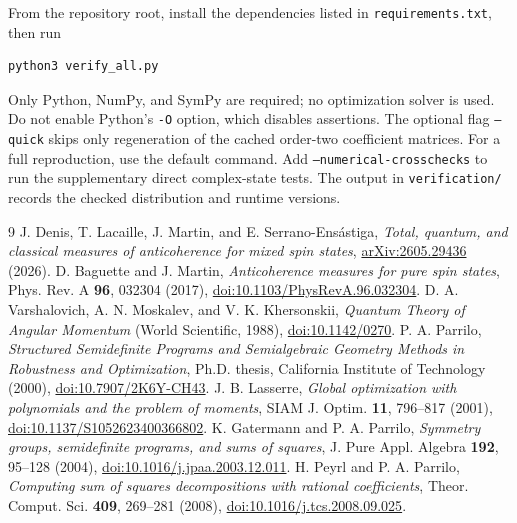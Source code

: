 \documentclass[11pt]{article}
\begin{document}
From the repository root, install the dependencies listed in \texttt{requirements.txt}, then run
\begin{verbatim}
python3 verify_all.py
\end{verbatim}
Only Python, NumPy, and SymPy are required; no optimization solver is used. Do not enable Python's \texttt{-O} option, which disables assertions. The optional flag \texttt{--quick} skips only regeneration of the cached order-two coefficient matrices. For a full reproduction, use the default command. Add \texttt{--numerical-crosschecks} to run the supplementary direct complex-state tests. The output in \texttt{verification/} records the checked distribution and runtime versions.

\begin{thebibliography}{9}
 J. Denis, T. Lacaille, J. Martin, and E. Serrano-Ens\'astiga, \emph{Total, quantum, and classical measures of anticoherence for mixed spin states}, \href{https://arxiv.org/abs/2605.29436}{arXiv:2605.29436} (2026).
 D. Baguette and J. Martin, \emph{Anticoherence measures for pure spin states}, Phys. Rev. A \textbf{96}, 032304 (2017), \href{https://doi.org/10.1103/PhysRevA.96.032304}{doi:10.1103/PhysRevA.96.032304}.
 D. A. Varshalovich, A. N. Moskalev, and V. K. Khersonskii, \emph{Quantum Theory of Angular Momentum} (World Scientific, 1988), \href{https://doi.org/10.1142/0270}{doi:10.1142/0270}.
 P. A. Parrilo, \emph{Structured Semidefinite Programs and Semialgebraic Geometry Methods in Robustness and Optimization}, Ph.D. thesis, California Institute of Technology (2000), \href{https://doi.org/10.7907/2K6Y-CH43}{doi:10.7907/2K6Y-CH43}.
 J. B. Lasserre, \emph{Global optimization with polynomials and the problem of moments}, SIAM J. Optim. \textbf{11}, 796--817 (2001), \href{https://doi.org/10.1137/S1052623400366802}{doi:10.1137/S1052623400366802}.
 K. Gatermann and P. A. Parrilo, \emph{Symmetry groups, semidefinite programs, and sums of squares}, J. Pure Appl. Algebra \textbf{192}, 95--128 (2004), \href{https://doi.org/10.1016/j.jpaa.2003.12.011}{doi:10.1016/j.jpaa.2003.12.011}.
 H. Peyrl and P. A. Parrilo, \emph{Computing sum of squares decompositions with rational coefficients}, Theor. Comput. Sci. \textbf{409}, 269--281 (2008), \href{https://doi.org/10.1016/j.tcs.2008.09.025}{doi:10.1016/j.tcs.2008.09.025}.
\end{thebibliography}
\end{document}
